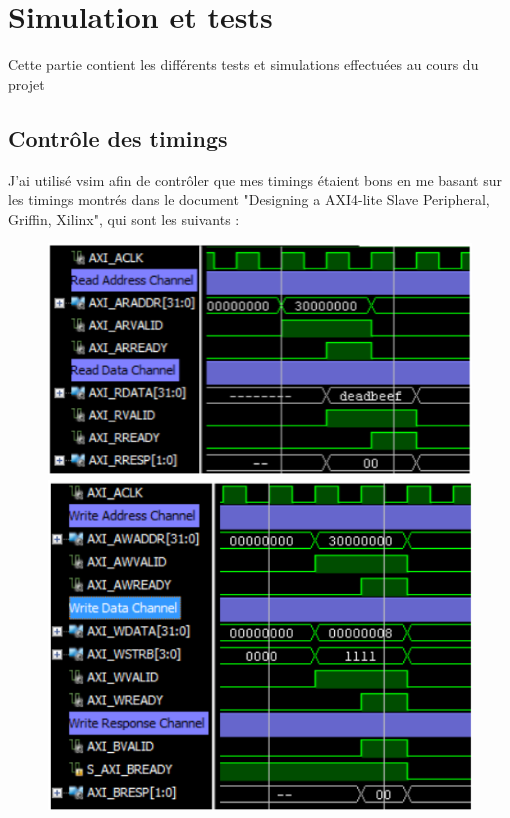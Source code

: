 \section{Simulation et tests}

Cette partie contient les différents tests et simulations effectuées au cours du projet

\subsection{Contrôle des timings}
J'ai utilisé vsim afin de contrôler que mes timings étaient bons en me basant sur les timings montrés dans le document "Designing a AXI4-lite Slave Peripheral, Griffin, Xilinx", qui sont les suivants : 

\begin{figure}[ht]
	\centering
	\begin{minipage}{.5\textwidth}
		\centering
		\includegraphics[scale=0.4]{./images/timing_read.png}
	\end{minipage}%
	\begin{minipage}{.5\textwidth}
		\centering
		\includegraphics[scale=0.4]{./images/write_timing.png}
	\end{minipage}
\end{figure}

